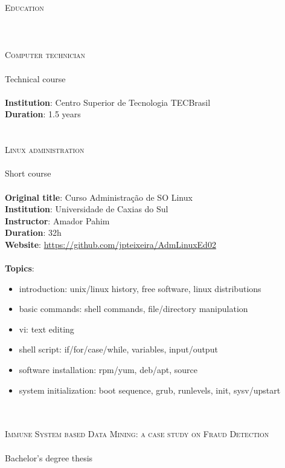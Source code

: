 \noindent \textsc{\Huge Education}
\\\\\\\\
\noindent \textsc{\Large Computer technician}
\\\\
Technical course
\\\\
\textbf{Institution}: Centro Superior de Tecnologia TECBrasil \\
\textbf{Duration}: 1.5 years
\\\\\\
\noindent \textsc{\Large Linux administration}
\\\\
Short course
\\\\
\textbf{Original title}: Curso Administração de SO Linux \\
\textbf{Institution}: Universidade de Caxias do Sul \\
\textbf{Instructor}: Amador Pahim \\
\textbf{Duration}: 32h \\
\textbf{Website}: \url{https://github.com/jpteixeira/AdmLinuxEd02}
\\\\
\textbf{Topics}:
\begin{itemize}
    \vspace{-2.5mm}
    \itemsep-1mm
    \item introduction: unix/linux history, free software, linux
        distributions
    \item basic commands: shell commands, file/directory manipulation
    \item vi: text editing
    \item shell script: if/for/case/while, variables, input/output
    \item software installation: rpm/yum, deb/apt, source
    \item system initialization: boot sequence, grub, runlevels, init,
        sysv/upstart
\end{itemize}
~\\\\
\noindent \textsc{
    \Large Immune System based Data Mining: a case study on Fraud Detection}
\\\\
Bachelor's degree thesis
\\\\
